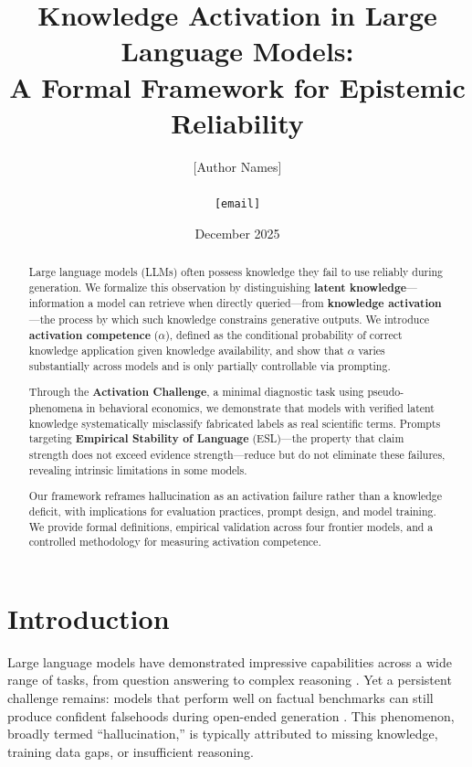 \documentclass[11pt,a4paper]{article}
\title{\textbf{Knowledge Activation in Large Language Models:\\A Formal Framework for Epistemic Reliability}}
\author{
  [Author Names]\\
  [Affiliation]\\
  \texttt{[email]}
}
\date{December 2025}
\begin{document}

\maketitle

\begin{abstract}
Large language models (LLMs) often possess knowledge they fail to use reliably during generation. We formalize this observation by distinguishing \textbf{latent knowledge}---information a model can retrieve when directly queried---from \textbf{knowledge activation}---the process by which such knowledge constrains generative outputs. We introduce \textbf{activation competence} ($\alpha$), defined as the conditional probability of correct knowledge application given knowledge availability, and show that $\alpha$ varies substantially across models and is only partially controllable via prompting.

Through the \textbf{Activation Challenge}, a minimal diagnostic task using pseudo-phenomena in behavioral economics, we demonstrate that models with verified latent knowledge systematically misclassify fabricated labels as real scientific terms. Prompts targeting \textbf{Empirical Stability of Language} (ESL)---the property that claim strength does not exceed evidence strength---reduce but do not eliminate these failures, revealing intrinsic limitations in some models.

Our framework reframes hallucination as an activation failure rather than a knowledge deficit, with implications for evaluation practices, prompt design, and model training. We provide formal definitions, empirical validation across four frontier models, and a controlled methodology for measuring activation competence.
\end{abstract}

\section{Introduction}

Large language models have demonstrated impressive capabilities across a wide range of tasks, from question answering to complex reasoning \citep{wei2022chain, kojima2022large}. Yet a persistent challenge remains: models that perform well on factual benchmarks can still produce confident falsehoods during open-ended generation \citep{ji2023survey, huang2023survey}. This phenomenon, broadly termed ``hallucination,'' is typically attributed to missing knowledge, training data gaps, or insufficient reasoning.
\end{document}
